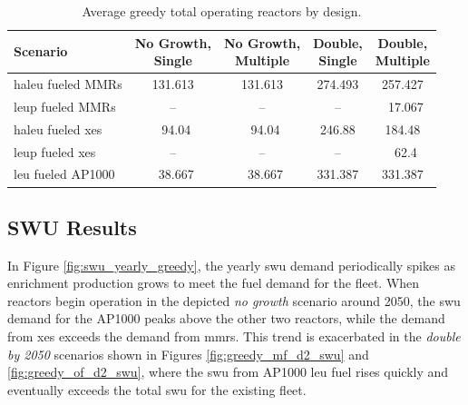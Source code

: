 \begin{table}[H]
  \centering
  \caption{Average greedy total operating reactors by design.}
  \label{tab:greedy_reac_avg}
  \begin{tabular}{l c c c c}
    \toprule
    Scenario & \shortstack{No Growth,\\ Single} & \shortstack{No Growth,\\ Multiple} & \shortstack{Double,\\ Single} & \shortstack{Double,\\ Multiple}  \\
    \midrule
     \gls{haleu} fueled MMRs      & 131.613 & 131.613 & 274.493 & 257.427 \\
     \gls{leup} fueled MMRs       & --      & --      & --      & \textcolor{white}{0}17.067 \\
     \gls{haleu} fueled \gls{xe}s & \textcolor{white}{0}94.04   & \textcolor{white}{0}94.04   & 246.88  & 184.48 \\
     \gls{leup} fueled \gls{xe}s  & --      & --      & --      & \textcolor{white}{0}62.4 \\
     \gls{leu} fueled AP1000      & \textcolor{white}{0}38.667  & \textcolor{white}{0}38.667  & 331.387 & 331.387 \\
     \bottomrule
  \end{tabular}
\end{table}




\subsection{SWU Results}
\label{sec:greedy_swu}

In Figure \ref{fig:swu_yearly_greedy}, the yearly \gls{swu} demand periodically spikes as enrichment production grows to meet the fuel demand for the fleet. When reactors begin operation in the depicted \textit{no growth} scenario around 2050, the \gls{swu} demand for the AP1000 peaks above the other two reactors, while the demand from \glspl{xe} exceeds the demand from \glspl{mmr}. This trend is exacerbated in the \textit{double by 2050} scenarios shown in Figures \ref{fig:greedy_mf_d2_swu} and \ref{fig:greedy_of_d2_swu}, where the \gls{swu} from AP1000 \gls{leu} fuel rises quickly and eventually exceeds the total \gls{swu} for the existing fleet.



